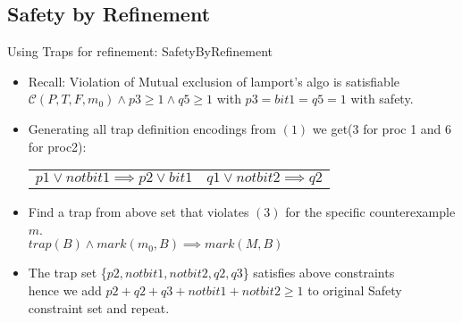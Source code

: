 \documentclass{beamer}
\begin{document}
\subsection{Safety by Refinement}
\begin{frame}{Using Traps for refinement: SafetyByRefinement}
  
  \begin{itemize}
  \item<1-> {
  Recall: Violation of Mutual exclusion of lamport's algo is satisfiable $\mathcal{C}(P,T,F,m_0)\land p3 \geq 1 \land q5 \geq 1 $ 
  with $p3=bit1=q5=1$ with safety.
  }
  \item<2-> {   
    Generating all trap definition encodings from $(1)$ we get(3 for proc 1 and 6 for proc2):
  \begin{center}
    \begin{tabular}{c c}
      {$p1 \vee notbit1 \implies p2 \vee bit1$} & {$q1 \vee notbit2 \implies q2$}\\
    \end{tabular} 
  \end{center}

  }
  \item<3-> {
    Find a trap from above set that violates $(3)$ for the specific counterexample $m$.\\
    $trap(B) \land mark(m_0,B) \implies mark(M,B)$\\

  }
  \item<5-> {The trap set \{$p2,notbit1,notbit2,q2,q3$\} satisfies above constraints\\ hence we add
    $p2+q2+q3+notbit1+notbit2 \geq 1$ to original Safety constraint set and repeat.}
 
  \end{itemize}
\end{frame}
\end{document}
